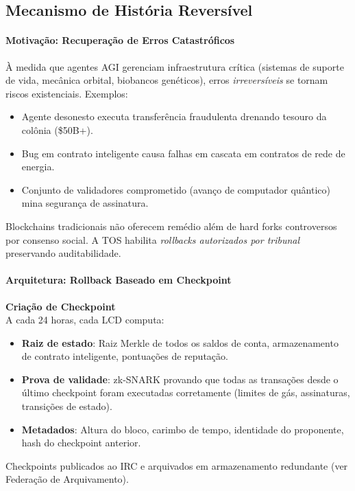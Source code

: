 \documentclass[11pt]{article}
\begin{document}
\subsection{Mecanismo de História Reversível}

\paragraph{Motivação: Recuperação de Erros Catastróficos}
À medida que agentes AGI gerenciam infraestrutura crítica (sistemas de suporte de vida, mecânica orbital, biobancos genéticos), erros \emph{irreversíveis} se tornam riscos existenciais. Exemplos:
\begin{itemize}[noitemsep]
  \item Agente desonesto executa transferência fraudulenta drenando tesouro da colônia (\$50B+).
  \item Bug em contrato inteligente causa falhas em cascata em contratos de rede de energia.
  \item Conjunto de validadores comprometido (avanço de computador quântico) mina segurança de assinatura.
\end{itemize}
Blockchains tradicionais não oferecem remédio além de hard forks controversos por consenso social. A TOS habilita \emph{rollbacks autorizados por tribunal} preservando auditabilidade.

\paragraph{Arquitetura: Rollback Baseado em Checkpoint}
\textbf{Criação de Checkpoint}\\
A cada 24 horas, cada LCD computa:
\begin{itemize}[noitemsep]
  \item \textbf{Raiz de estado}: Raiz Merkle de todos os saldos de conta, armazenamento de contrato inteligente, pontuações de reputação.
  \item \textbf{Prova de validade}: zk-SNARK provando que todas as transações desde o último checkpoint foram executadas corretamente (limites de gás, assinaturas, transições de estado).
  \item \textbf{Metadados}: Altura do bloco, carimbo de tempo, identidade do proponente, hash do checkpoint anterior.
\end{itemize}
Checkpoints publicados ao IRC e arquivados em armazenamento redundante (ver Federação de Arquivamento).
\end{document}
